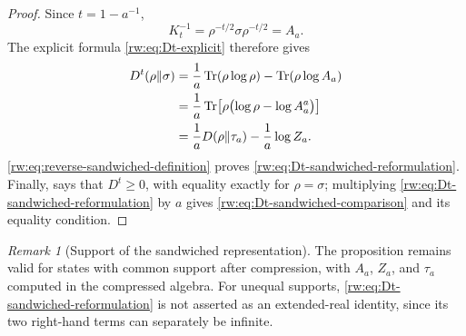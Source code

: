 \documentclass[11pt]{article}
\theoremstyle{remark}
\newtheorem{remark}[remark]{Remark}
\newcommand{\1}{\mathbbm{1}}
\begin{document}
\begin{proof}
Since $t=1-a^{-1}$,
\begin{equation}
 K_t^{-1}
 =\rho^{-t/2}\sigma\rho^{-t/2}
 =A_a.
 \label{rw:eq:Kt-inverse-sandwiched}
\end{equation}
The explicit formula \eqref{rw:eq:Dt-explicit} therefore gives
\begin{align}
 D^t(\rho\Vert\sigma)
 &=\frac1a\operatorname{Tr}(\rho\log\rho)
   -\operatorname{Tr}(\rho\log A_a)\notag\\
 &=\frac1a\operatorname{Tr}\!\left[
   \rho\bigl(\log\rho-\log A_a^a\bigr)\right]\notag\\
 &=\frac1aD(\rho\Vert\tau_a)-\frac1a\log Z_a.
 \label{rw:eq:Dt-sandwiched-proof-calculation}
\end{align}
\eqref{rw:eq:reverse-sandwiched-definition} proves
\eqref{rw:eq:Dt-sandwiched-reformulation}.  Finally,
 says that
$D^t\geq0$, with equality exactly for $\rho=\sigma$; multiplying
\eqref{rw:eq:Dt-sandwiched-reformulation} by $a$ gives
\eqref{rw:eq:Dt-sandwiched-comparison} and its equality condition.
\end{proof}

\begin{remark}[Support of the sandwiched representation]
The proposition remains valid for states with common support after
compression, with $A_a$, $Z_a$, and $\tau_a$ computed in the
compressed algebra.  For unequal supports,
\eqref{rw:eq:Dt-sandwiched-reformulation} is not asserted as an
extended-real identity, since its two right-hand terms can separately
be infinite.
\end{remark}
\end{document}
